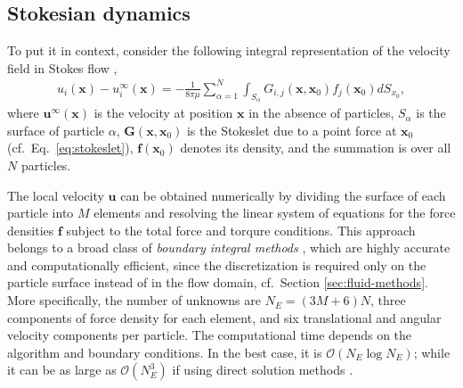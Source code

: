 \subsection{Stokesian dynamics}
\label{subsec:sd}

To put it in context, consider the following integral representation of the velocity field in Stokes flow \citep{Ladyzhenskaya},
\begin{equation} \label{eq:boundary-integral}
 \begin{aligned}
  u_i(\bm{x}) - u_i^\infty(\bm{x}) = -\frac{1}{8\pi \mu} \sum_{\alpha=1}^N  \int_{S_\alpha} G_{i,j} (\bm{x},\bm{x}_0) f_j(\bm{x}_0) dS_{x_0},
 \end{aligned}
\end{equation}
where $\bm{u}^\infty(\bm{x})$ is the velocity at position $\bm{x}$ in the absence of particles,
$S_\alpha$ is the surface of particle $\alpha$,
$\bm{G}(\bm{x},\bm{x}_0)$ is the Stokeslet due to a point force at $\bm{x}_0$ (cf.\ Eq.\ \ref{eq:stokeslet}),
$\bm f(\bm{x}_0)$ denotes its density,
and the summation is over all $N$ particles.

The local velocity $\bm{u}$ can be obtained numerically by dividing the surface of each particle into $M$ elements and resolving the linear system of equations for the force densities $\bm f$ subject to the total force and torqure conditions.
This approach belongs to a broad class of \emph{boundary integral methods} \citep{Pozrikidis}, which are highly accurate and computationally efficient, since the discretization is required only on the particle surface instead of in the flow domain, cf.\ Section \ref{sec:fluid-methods}.
More specifically, the number of unknowns are $N_E=(3M+6)N$, \ie three components of force density for each element, and six translational and angular velocity components per particle.
The computational time depends on the algorithm and boundary conditions. In the best case, it is $\mathcal{O}(N_E\log N_E)$; while it can be as large as $\mathcal{O}(N_E^3)$ if using direct solution methods \citep{graham_2018}.

